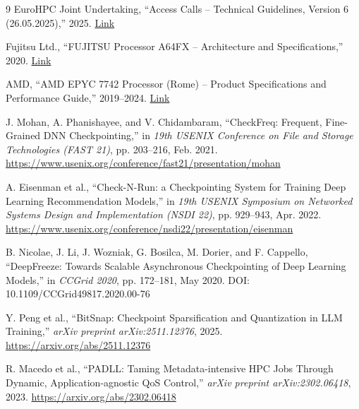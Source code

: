\documentclass[conference,a4paper]{IEEEtran}
\begin{document}
\begin{thebibliography}{9}
        EuroHPC Joint Undertaking,
        ``Access Calls -- Technical Guidelines, Version 6 (26.05.2025),'' 2025.
        \href{https://www.eurohpc-ju.europa.eu/document/download/7ac29264-106d-497c-9683-42aec21bf10f_en?filename=Technical_Guidelines-all+calls-26.05.2025.pdf}{Link}

        Fujitsu Ltd.,
        ``FUJITSU Processor A64FX -- Architecture and Specifications,'' 2020.
        \href{https://www.fujitsu.com/global/products/computing/servers/supercomputer/a64fx/}{Link}

        AMD,
        ``AMD EPYC 7742 Processor (Rome) -- Product Specifications and Performance Guide,''
        2019--2024.
        \href{https://www.amd.com/en/products/cpu/amd-epyc-7742}{Link}

        J. Mohan, A. Phanishayee, and V. Chidambaram,
        ``CheckFreq: Frequent, Fine-Grained DNN Checkpointing,''
        in \textit{19th USENIX Conference on File and Storage Technologies (FAST 21)},
        pp. 203--216, Feb. 2021.
        \url{https://www.usenix.org/conference/fast21/presentation/mohan}

        A. Eisenman et al.,
        ``Check-N-Run: a Checkpointing System for Training Deep Learning Recommendation Models,''
        in \textit{19th USENIX Symposium on Networked Systems Design and Implementation (NSDI 22)},
        pp. 929--943, Apr. 2022.
        \url{https://www.usenix.org/conference/nsdi22/presentation/eisenman}

        B. Nicolae, J. Li, J. Wozniak, G. Bosilca, M. Dorier, and F. Cappello,
        ``DeepFreeze: Towards Scalable Asynchronous Checkpointing of Deep Learning Models,''
        in \textit{CCGrid 2020}, pp. 172--181, May 2020.
        DOI: 10.1109/CCGrid49817.2020.00-76

        Y. Peng et al.,
        ``BitSnap: Checkpoint Sparsification and Quantization in LLM Training,''
        \textit{arXiv preprint arXiv:2511.12376}, 2025.
        \url{https://arxiv.org/abs/2511.12376}

        R. Macedo et al.,
        ``PADLL: Taming Metadata-intensive HPC Jobs Through Dynamic, Application-agnostic QoS Control,''
        \textit{arXiv preprint arXiv:2302.06418}, 2023.
        \url{https://arxiv.org/abs/2302.06418}

\end{thebibliography}
\end{document}
